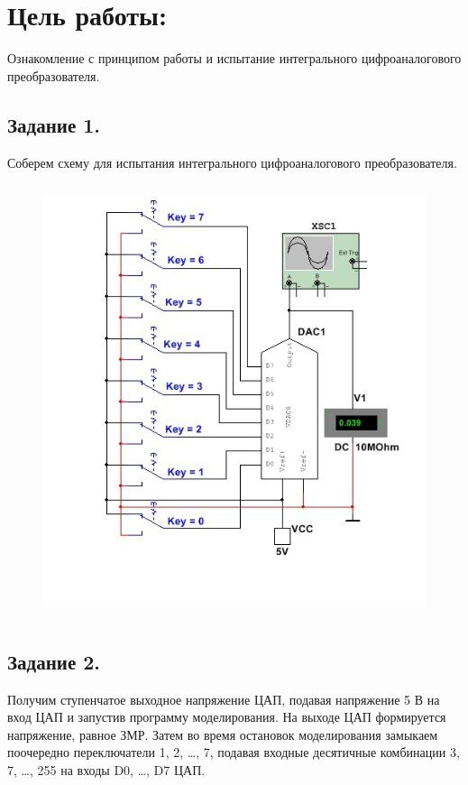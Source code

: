 \documentclass[spec, och, labwork]{shiza}
\begin{document}

\section*{Цель работы:}

Ознакомление с принципом работы и испытание интегрального цифроаналогового
преобразователя.

\subsection*{Задание 1.}

Соберем схему для испытания интегрального цифроаналогового преобразователя.

\begin{figure}[H]
    \centering
    \includegraphics[width=4.58333in,height=5.00833in]{image1.jpeg}
\end{figure}

\subsection*{Задание 2.}

Получим ступенчатое выходное напряжение ЦАП, подавая напряжение 5 В на вход ЦАП
и запустив программу моделирования. На выходе ЦАП формируется напряжение, равное
ЗМР. Затем во время остановок моделирования замыкаем поочередно переключатели 1,
2, \ldots, 7, подавая входные десятичные комбинации 3, 7, \ldots, 255 на входы
D0, \ldots, D7 ЦАП.
\end{document}
